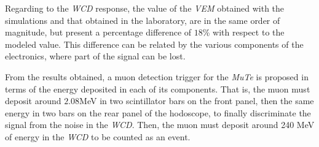 \documentclass[submitting]{nst}
\begin{document}
Regarding to the \textsl{WCD} response, the value of the \textsl{VEM} obtained with the simulations and that obtained in the laboratory, are in the same order of magnitude, but present a percentage difference of $18$\% with respect to the modeled value. This difference can be related by the various components of the electronics, where part of the signal can be lost.

From the results obtained, a muon detection trigger for the \textsl{MuTe} is proposed in terms of the energy deposited in each of its components. That is, the muon must deposit around $2.08$MeV in two scintillator bars on the front panel, then the same energy in two bars on the rear panel of the hodoscope, to finally discriminate the signal from the noise in the \textsl{WCD}. Then, the muon must deposit around 240 MeV of energy in the \textsl{WCD} to be counted as an event.





\end{document}

